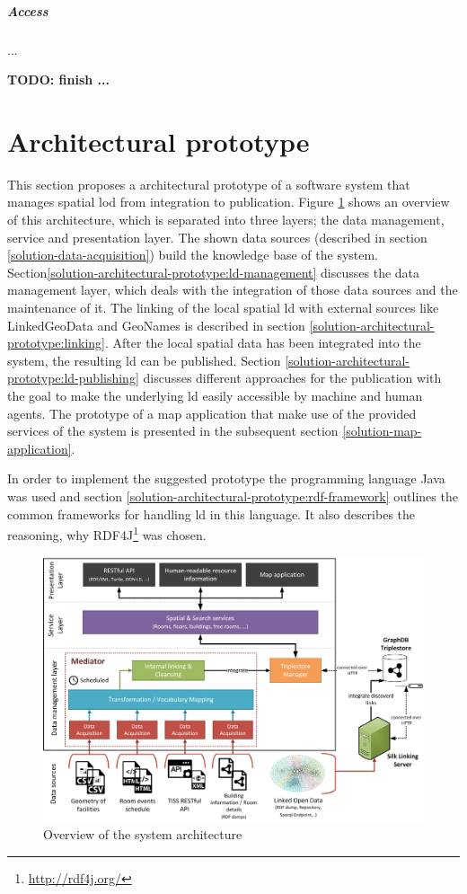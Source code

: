 \documentclass[draft,final]{vutinfth} %
\newcommand{\todo}[1]{{\color{red}\textbf{TODO: {#1}}}} %
\begin{document}
\subparagraph{Access} ...

\todo{finish ... }

\section{Architectural prototype}
\label{solution-architectural-prototype}

This section proposes a architectural prototype of a software system that manages spatial \gls{lod} from integration to publication. Figure \ref{fig:solution-architectural-prototype} shows an overview of this architecture, which is separated into three layers; the data management, service and presentation layer. The shown data sources (described in section \ref{solution-data-acquisition}) build the knowledge base of the system. Section\ref{solution-architectural-prototype:ld-management} discusses the data management layer, which deals with the integration of those data sources and the maintenance of it. The linking of the local spatial \gls{ld} with external sources like LinkedGeoData and GeoNames is described in section \ref{solution-architectural-prototype:linking}. After the local spatial data has been integrated into the system, the resulting \gls{ld} can be published. Section \ref{solution-architectural-prototype:ld-publishing} discusses different approaches for the publication with the goal to make the underlying \gls{ld} easily accessible by machine and human agents. The prototype of a map application that make use of the provided services of the system is presented in the subsequent section \ref{solution-map-application}.   

In order to implement the suggested prototype the programming language Java was used and section \ref{solution-architectural-prototype:rdf-framework} outlines the common frameworks for handling \gls{ld} in this language. It also describes the reasoning, why RDF4J\footnote{\url{http://rdf4j.org/}} was chosen.

\begin{figure}[h]
    \centering
    \includegraphics[width=1.0\textwidth]{graphics/finderArchitecture.png}
    \caption{Overview of the system architecture}
    \label{fig:solution-architectural-prototype}
\end{figure}
\end{document}
